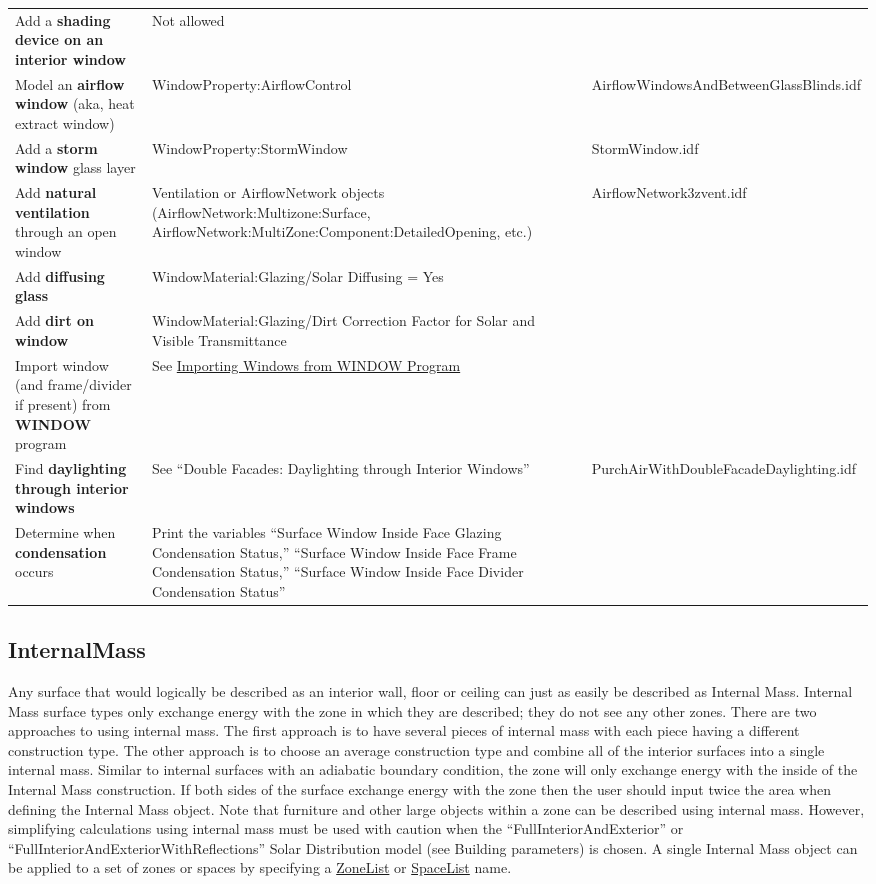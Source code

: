 \begin{longtable}[c]{p{2.0in}p{2.0in}p{2.0in}}
Add a \textbf{shading device on an interior window} & Not allowed & \tabularnewline
Model an \textbf{airflow window} (aka, heat extract window) & Window\-Property:\-Air\-flow\-Control & Air\-flow\-Windows\-And\-Between\-Glass\-Blinds.idf \tabularnewline
Add a \textbf{storm window} glass layer & Window\-Property:\-Storm\-Window & Storm\-Window.idf \tabularnewline
Add \textbf{natural ventilation} through an open window & Ventilation or Airflow\-Network objects (Airflow\-Network:\-Multizone:\-Surface, Airflow\-Network:\-Multi\-Zone:\-Component:\-Detailed\-Opening, etc.) & Airflow\-Network\-3zvent.idf \tabularnewline
Add \textbf{diffusing glass} & Window\-Material:\-Glazing/\-Solar Diffusing = Yes & \tabularnewline
Add \textbf{dirt on window} & Window\-Material:\-Glazing/\-Dirt Correction Factor for Solar and Visible Transmittance & \tabularnewline
Import window (and frame/divider if present) from \textbf{WINDOW} program & See \hyperref[importing-windows-from-window-program]{Importing Windows from WINDOW Program} & \tabularnewline
Find \textbf{daylighting through interior windows} & See ``Double Facades: Daylighting through Interior Windows'' & Purch\-Air\-With\-Double\-Facade\-Daylighting.idf \tabularnewline
Determine when \textbf{condensation} occurs & Print the variables ``Surface Window Inside Face Glazing Condensation Status,'' ``Surface Window Inside Face Frame Condensation Status,'' ``Surface Window Inside Face Divider Condensation Status'' & \tabularnewline
\bottomrule
\end{longtable}

\subsection{InternalMass}\label{internalmass}

Any surface that would logically be described as an interior wall, floor or ceiling can just as easily be described as Internal Mass. Internal Mass surface types only exchange energy with the zone in which they are described; they do not see any other zones. There are two approaches to using internal mass. The first approach is to have several pieces of internal mass with each piece having a different construction type. The other approach is to choose an average construction type and combine all of the interior surfaces into a single internal mass. Similar to internal surfaces with an adiabatic boundary condition, the zone will only exchange energy with the inside of the Internal Mass construction. If both sides of the surface exchange energy with the zone then the user should input twice the area when defining the Internal Mass object. Note that furniture and other large objects within a zone can be described using internal mass. However, simplifying calculations using internal mass must be used with caution when the ``FullInteriorAndExterior'' or ``FullInteriorAndExteriorWithReflections'' Solar Distribution model (see Building parameters) is chosen. A single Internal Mass object can be applied to a set of zones or spaces by specifying a \hyperref[zonelist]{ZoneList} or \hyperref[spacelist]{SpaceList} name.

